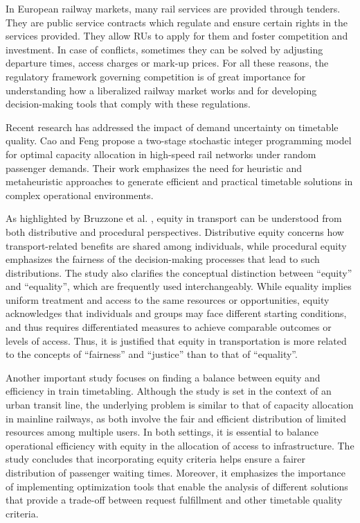 \documentclass[preprint,12pt]{elsarticle}
\begin{document}
In European railway markets, many rail services are provided through tenders. They are public service contracts which regulate and ensure certain rights in the services provided. They allow \glspl{RU} to apply for them and foster competition and investment. In case of conflicts, sometimes they can be solved by adjusting departure times, access charges or mark-up prices. For all these reasons, the regulatory framework governing competition is of great importance for understanding how a liberalized railway market works and for developing decision-making tools that comply with these regulations.

Recent research has addressed the impact of demand uncertainty on timetable quality. Cao and Feng \cite{Cao2020} propose a two-stage stochastic integer programming model for optimal capacity allocation in high-speed rail networks under random passenger demands. Their work emphasizes the need for heuristic and metaheuristic approaches to generate efficient and practical timetable solutions in complex operational environments.

As highlighted by Bruzzone et al. \cite{Bruzzone2023}, equity in transport can be understood from both distributive and procedural perspectives. Distributive equity concerns how transport-related benefits are shared among individuals, while procedural equity emphasizes the fairness of the decision-making processes that lead to such distributions. The study also clarifies the conceptual distinction between ``equity'' and ``equality'', which are frequently used interchangeably. While equality implies uniform treatment and access to the same resources or opportunities, equity acknowledges that individuals and groups may face different starting conditions, and thus requires differentiated measures to achieve comparable outcomes or levels of access. Thus, it is justified that equity in transportation is more related to the concepts of ``fairness'' and ``justice'' than to that of ``equality''.

Another important study \cite{Zhang2019} focuses on finding a balance between equity and efficiency in train timetabling. Although the study is set in the context of an urban transit line, the underlying problem is similar to that of capacity allocation in mainline railways, as both involve the fair and efficient distribution of limited resources among multiple users. In both settings, it is essential to balance operational efficiency with equity in the allocation of access to infrastructure. The study concludes that incorporating equity criteria helps ensure a fairer distribution of passenger waiting times. Moreover, it emphasizes the importance of implementing optimization tools that enable the analysis of different solutions that provide a trade-off between request fulfillment and other timetable quality criteria.
\end{document}
